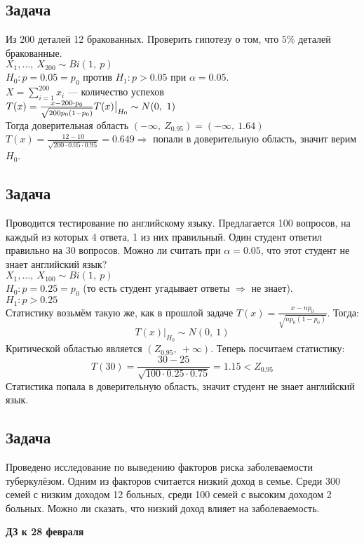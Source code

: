 \documentclass[12pt, a4paper]{article}
\begin{document}
\subsection*{Задача}
Из 200 деталей 12 бракованных. Проверить гипотезу о том, что $5\%$ деталей бракованные.\\
$X_1,\dots,\ X_{200} \sim Bi(1,\ p)$\\
$H_0: p = 0.05 = p_0$ против $H_1: p > 0.05$ при $\alpha = 0.05$.\\
$X = \sum_{i = 1}^{200} x_i$ --- количество успехов\\
$T(x) = \frac{x - 200\cdot p_0}{\sqrt{200p_0(1 - p_0)}}\\
    T(x)\big|_{H_0} \sim N(0,\ 1)$\\
Тогда доверительная область $(-\infty,\ Z_{0.95}) = (-\infty,\ 1.64)$\\
$T(x) = \frac{12 - 10}{\sqrt{200\cdot 0.05\cdot 0.95}} = 0.649\Rightarrow$ попали в доверительную область, значит верим $H_0$.
\subsection*{Задача}
Проводится тестирование по английскому языку. Предлагается 100 вопросов, на каждый из которых 4 ответа, 1 из них правильный. Один студент ответил правильно на 30 вопросов. Можно ли считать при $\alpha = 0.05$, что этот студент не знает английский язык?\\
$X_1,\dots,\ X_{100} \sim Bi(1,\ p)$\\
$H_0: p = 0.25 = p_0$ (то есть студент угадывает ответы $\Rightarrow$ не знает).\\
$H_1: p > 0.25$\\
Статистику возьмём такую же, как в прошлой задаче $T(x) = \frac{x - np_0}{\sqrt{np_0(1 - p_0)}}$. Тогда:
\[T(x)\big|_{H_0} \sim N(0,\ 1)\]
Критической областью является $(Z_{0.95},\ +\infty)$. Теперь посчитаем статистику:
\[T(30) = \frac{30 - 25}{\sqrt{100\cdot 0.25\cdot 0.75}} = 1.15 < Z_{0.95}\]
Статистика попала в доверительную область, значит студент не знает английский язык.
\subsection*{Задача}
Проведено исследование по выведению факторов риска заболеваемости туберкулёзом. Одним из факторов считается низкий доход в семье. Среди 300 семей с низким доходом 12 больных, среди 100 семей с высоким доходом 2 больных. Можно ли сказать, что низкий доход влияет на заболеваемость.
\newpage
\begin{center}
    \bf ДЗ к 28 февраля
\end{center}
\end{document}
